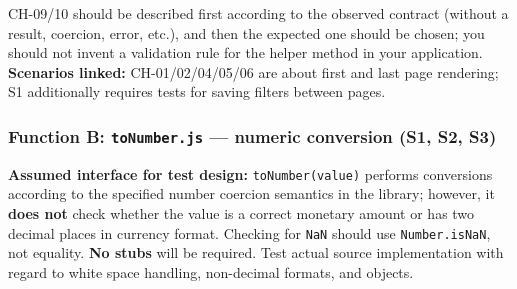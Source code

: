 \documentclass[
  9pt,
]{article}
\begin{document}
CH-09/10 should be described first according to the observed contract
(without a result, coercion, error, etc.), and then the expected one
should be chosen; you should not invent a validation rule for the helper
method in your application. \textbf{Scenarios linked:} CH-01/02/04/05/06
are about first and last page rendering; S1 additionally requires tests
for saving filters between pages.

\subsubsection{\texorpdfstring{Function B: \texttt{toNumber.js} ---
numeric conversion (S1, S2,
S3)}{Function B: toNumber.js --- numeric conversion (S1, S2, S3)}}\label{function-b-tonumber.js-numeric-conversion-s1-s2-s3}

\textbf{Assumed interface for test design:} \texttt{toNumber(value)}
performs conversions according to the specified number coercion
semantics in the library; however, it \textbf{does not} check whether
the value is a correct monetary amount or has two decimal places in
currency format. Checking for \texttt{NaN} should use
\texttt{Number.isNaN}, not equality. \textbf{No stubs} will be required.
Test actual source implementation with regard to white space handling,
non-decimal formats, and objects.
\end{document}
